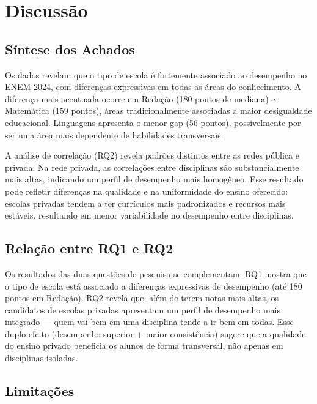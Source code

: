 \documentclass[a4paper,12pt]{article}
\begin{document}
\section{Discussão}

\subsection{Síntese dos Achados}

Os dados revelam que o tipo de escola é fortemente associado ao desempenho no ENEM 2024, com diferenças expressivas em todas as áreas do conhecimento. A diferença mais acentuada ocorre em Redação (180 pontos de mediana) e Matemática (159 pontos), áreas tradicionalmente associadas a maior desigualdade educacional. Linguagens apresenta o menor gap (56 pontos), possivelmente por ser uma área mais dependente de habilidades transversais.

A análise de correlação (RQ2) revela padrões distintos entre as redes pública e privada. Na rede privada, as correlações entre disciplinas são substancialmente mais altas, indicando um perfil de desempenho mais homogêneo. Esse resultado pode refletir diferenças na qualidade e na uniformidade do ensino oferecido: escolas privadas tendem a ter currículos mais padronizados e recursos mais estáveis, resultando em menor variabilidade no desempenho entre disciplinas.

\subsection{Relação entre RQ1 e RQ2}

Os resultados das duas questões de pesquisa se complementam. RQ1 mostra que o tipo de escola está associado a diferenças expressivas de desempenho (até 180 pontos em Redação). RQ2 revela que, além de terem notas mais altas, os candidatos de escolas privadas apresentam um perfil de desempenho mais integrado — quem vai bem em uma disciplina tende a ir bem em todas. Esse duplo efeito (desempenho superior + maior consistência) sugere que a qualidade do ensino privado beneficia os alunos de forma transversal, não apenas em disciplinas isoladas.

\subsection{Limitações}
\end{document}
